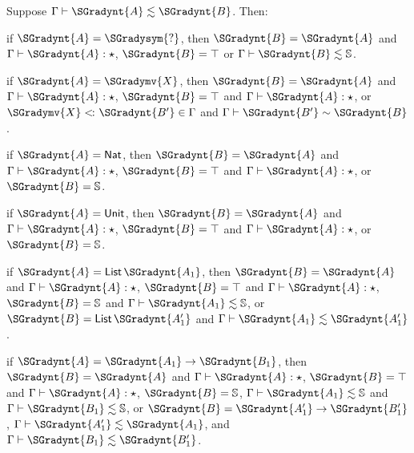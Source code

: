 \begin{lemma}
  \label{lemma:inversion_of_consistent_subtyping}
  Suppose $ \Gamma  \vdash  \SGradynt{A}  \lesssim  \SGradynt{B} $. Then:
  \begin{enumR}
  \item if $\SGradynt{A} = \SGradysym{\mbox{?}}$, then
    $\SGradynt{B} = \SGradynt{A}$ and $ \Gamma  \vdash  \SGradynt{A}  : \star $, $\SGradynt{B} =  \top $ or $ \Gamma  \vdash  \SGradynt{B}  \lesssim   \mathbb{S}  $.
  \item if $\SGradynt{A} = \SGradymv{X}$, then
    $\SGradynt{B} = \SGradynt{A}$ and $ \Gamma  \vdash  \SGradynt{A}  : \star $, $\SGradynt{B} =  \top $ and $ \Gamma  \vdash  \SGradynt{A}  : \star $, or $ \SGradymv{X}  <\hspace{-2px}\colon  \SGradynt{B'}  \in  \Gamma $ and $ \Gamma  \vdash  \SGradynt{B'}  \sim  \SGradynt{B} $.
  \item if $\SGradynt{A} =  \mathsf{Nat} $, then
    $\SGradynt{B} = \SGradynt{A}$ and $ \Gamma  \vdash  \SGradynt{A}  : \star $, $\SGradynt{B} =  \top $ and $ \Gamma  \vdash  \SGradynt{A}  : \star $, or $\SGradynt{B} =  \mathbb{S} $.
  \item if $\SGradynt{A} =  \mathsf{Unit} $, then
    $\SGradynt{B} = \SGradynt{A}$ and $ \Gamma  \vdash  \SGradynt{A}  : \star $, $\SGradynt{B} =  \top $ and $ \Gamma  \vdash  \SGradynt{A}  : \star $, or $\SGradynt{B} =  \mathbb{S} $.
  \item if $\SGradynt{A} =  \mathsf{List}\, \SGradynt{A_{{\mathrm{1}}}} $, then
    $\SGradynt{B} = \SGradynt{A}$ and $ \Gamma  \vdash  \SGradynt{A}  : \star $, $\SGradynt{B} =  \top $ and $ \Gamma  \vdash  \SGradynt{A}  : \star $, $\SGradynt{B} =  \mathbb{S} $ and $ \Gamma  \vdash  \SGradynt{A_{{\mathrm{1}}}}  \lesssim   \mathbb{S}  $,
    or $\SGradynt{B} =  \mathsf{List}\, \SGradynt{A'_{{\mathrm{1}}}} $ and $ \Gamma  \vdash  \SGradynt{A_{{\mathrm{1}}}}  \lesssim  \SGradynt{A'_{{\mathrm{1}}}} $.
  \item if $\SGradynt{A} = \SGradynt{A_{{\mathrm{1}}}}  \rightarrow  \SGradynt{B_{{\mathrm{1}}}}$, then
    $\SGradynt{B} = \SGradynt{A}$ and $ \Gamma  \vdash  \SGradynt{A}  : \star $, $\SGradynt{B} =  \top $ and $ \Gamma  \vdash  \SGradynt{A}  : \star $, $\SGradynt{B} =  \mathbb{S} $, $ \Gamma  \vdash  \SGradynt{A_{{\mathrm{1}}}}  \lesssim   \mathbb{S}  $ and
    $ \Gamma  \vdash  \SGradynt{B_{{\mathrm{1}}}}  \lesssim   \mathbb{S}  $, or $\SGradynt{B} = \SGradynt{A'_{{\mathrm{1}}}}  \rightarrow  \SGradynt{B'_{{\mathrm{1}}}}$, $ \Gamma  \vdash  \SGradynt{A'_{{\mathrm{1}}}}  \lesssim  \SGradynt{A_{{\mathrm{1}}}} $, and $ \Gamma  \vdash  \SGradynt{B_{{\mathrm{1}}}}  \lesssim  \SGradynt{B'_{{\mathrm{1}}}} $.

\end{enumR}
\end{lemma}
